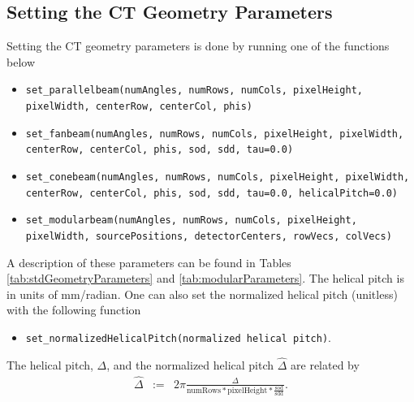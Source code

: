 \documentclass[11pt]{article}
\begin{document}
\subsection{Setting the CT Geometry Parameters}

Setting the CT geometry parameters is done by running one of the functions below
\begin{itemize}
\item[] \texttt{set\_parallelbeam(numAngles, numRows, numCols, pixelHeight, pixelWidth, centerRow, centerCol, phis)}
\item[] \texttt{set\_fanbeam(numAngles, numRows, numCols, pixelHeight, pixelWidth, centerRow, centerCol, phis, sod, sdd, tau=0.0)}
\item[] \texttt{set\_conebeam(numAngles, numRows, numCols, pixelHeight, pixelWidth, centerRow, centerCol, phis, sod, sdd, tau=0.0, helicalPitch=0.0)}
\item[] \texttt{set\_modularbeam(numAngles, numRows, numCols, pixelHeight, pixelWidth, sourcePositions, detectorCenters, rowVecs, colVecs)}
\end{itemize}
A description of these parameters can be found in Tables \ref{tab:stdGeometryParameters} and \ref{tab:modularParameters}.  The helical pitch is in units of mm/radian.  One can also set the normalized helical pitch (unitless) with the following function
\begin{itemize}
    \item[] \texttt{set\_normalizedHelicalPitch(normalized helical pitch)}.
\end{itemize}
The helical pitch, $\Delta$, and the normalized helical pitch $\widehat{\Delta}$ are related by
\begin{eqnarray*}
\widehat{\Delta} &:=& 2\pi \frac{\Delta}{\text{numRows} * \text{pixelHeight} * \frac{\text{sod}}{\text{sdd}}}.
\end{eqnarray*}
\end{document}
